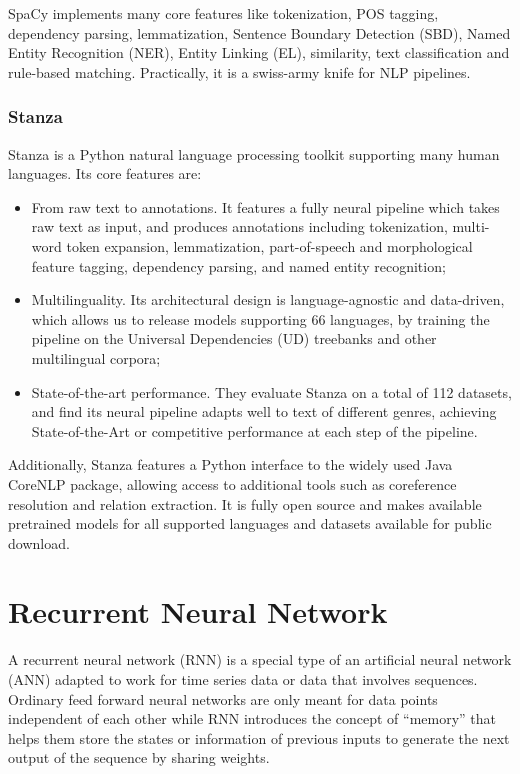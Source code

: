 SpaCy implements many core features like tokenization, POS tagging,
dependency parsing, lemmatization, Sentence Boundary Detection (SBD),
Named Entity Recognition (NER), Entity Linking (EL), similarity, text
classification and rule-based matching. Practically, it is a swiss-army
knife for NLP pipelines.

\subsubsection{Stanza}

Stanza \cite{qi2020stanza} is a Python natural language
processing toolkit supporting many human languages. Its core features are:
\begin{itemize}
  \item From raw text to annotations. It features a fully neural
  pipeline which takes raw text as input, and produces annotations
  including tokenization, multi-word token expansion, lemmatization,
  part-of-speech and morphological feature tagging, dependency
  parsing, and named entity recognition;
  \item Multilinguality. Its architectural design is language-agnostic
  and data-driven, which allows us to release models supporting 66
  languages, by training the pipeline on the Universal Dependencies
  (UD) treebanks and other multilingual corpora;
  \item State-of-the-art performance. They evaluate Stanza on a total
  of 112 datasets, and find its neural pipeline adapts well to text of
  different genres, achieving State-of-the-Art or competitive
  performance at each step of the pipeline.
\end{itemize}
Additionally, Stanza features a Python interface to the widely used
Java CoreNLP package, allowing access to additional tools such as
coreference resolution and relation extraction. It is fully open
source and makes available pretrained models for all supported
languages and datasets available for public download.

\section{Recurrent Neural Network}
\label{sec:rnn}

A recurrent neural network (RNN) is a special type of an artificial
neural network (ANN) adapted to work for time series data or data that
involves sequences. Ordinary feed forward neural networks are only
meant for data points independent of each other while RNN introduces
the concept of ``memory'' that helps them store the states or
information of previous inputs to generate the next output of the
sequence by sharing weights.

